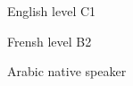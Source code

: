 

\begin{cvskills}

      \cvskill
    {English} %
    {level C1} %

      \cvskill
    {Frensh} %
    {level B2} %

      \cvskill
    {Arabic} %
    {native speaker} %
\end{cvskills}
